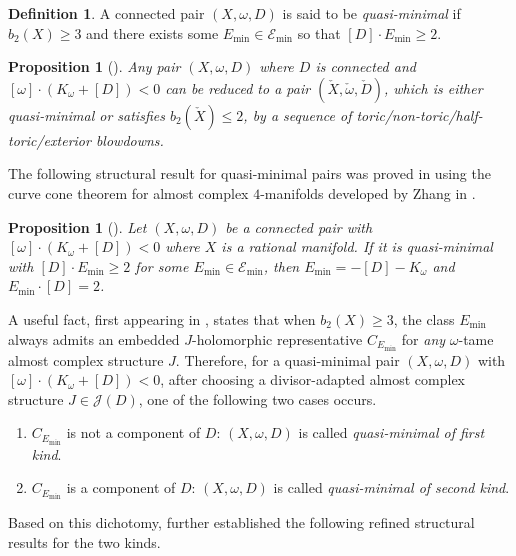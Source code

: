 \documentclass[11pt]{article}
\newtheorem{proposition}[theorem]{Proposition}
\theoremstyle{definition}
\newtheorem{definition}[theorem]{Definition}
\theoremstyle{remark}
\begin{document}
\begin{definition}\label{def:quasimin}
    A connected pair $(X,\omega,D)$ is said to be \emph{quasi-minimal} if $b_2(X)\geq 3$ and there exists some $E_{\text{min}}\in\mathcal{E}_{\text{min}}$ so that $[D]\cdot E_{\text{min}}\geq 2$.
\end{definition}

\begin{proposition}[\cite{LN25}]\label{prop:minimalreduction}
  Any pair $(X,\omega,D)$ where $D$ is connected and $[\omega]\cdot(K_{\omega}+[D])<0$ can be reduced to a pair $(\check{X},\check{\omega},\check{D})$, which is either quasi-minimal or satisfies $b_2(\check{X})\leq 2$, by a sequence of toric/non-toric/half-toric/exterior blowdowns.
\end{proposition}


The following structural result for quasi-minimal pairs was proved in \cite[Section 5]{LN25} using the curve cone theorem for almost complex $4$-manifolds developed by Zhang in \cite{Zhangcurvecone}. 

\begin{proposition}[\cite{LN25}]\label{prop:-K-D=Emin}
   Let $(X,\omega,D)$ be a connected pair with $[\omega]\cdot(K_{\omega}+[D])<0$ where $X$ is a rational manifold. If it is quasi-minimal with $[D]\cdot E_{\text{min}}\geq 2$ for some $E_{\text{min}}\in\mathcal{E}_{\text{min}}$, then $E_{\text{min}}=-[D]-K_{\omega}$ and $E_{\text{min}}\cdot [D]=2$.
\end{proposition}

A useful fact, first appearing in \cite[Lemma 1.2]{Pinsonnault}, states that when $b_2(X)\geq 3$, the class $E_{\text{min}}$ always admits an embedded $J$-holomorphic representative $C_{E_{\text{min}}}$ for \emph{any} $\omega$-tame almost complex structure $J$. Therefore, for a quasi-minimal pair $(X,\omega,D)$ with $[\omega]\cdot(K_{\omega}+[D])<0$, after choosing a divisor-adapted almost complex structure $J\in \mathcal{J}(D)$, one of the following two cases occurs.
\begin{enumerate}[nosep]
  \item $C_{E_{\text{min}}}$ is not a component of $D$: $(X,\omega,D)$ is called \emph{quasi-minimal of first kind}.
  \item $C_{E_{\text{min}}}$ is a component of $D$: $(X,\omega,D)$ is called \emph{quasi-minimal of second kind}.
\end{enumerate}

Based on this dichotomy, \cite[Section 5]{LN25} further established the following refined structural results for the two kinds.
\end{document}
